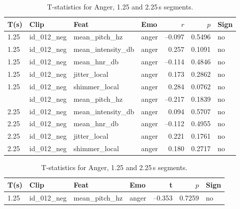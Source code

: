   \begin{table}[ht]
    \centering
    \begin{subtable}[t]{0.48\textwidth}
      \centering
      \caption{Pearson correlations for Anger, 1.25 and 2.25s segments.}
      \label{tab:pearson_anger_125_225s}
      \begin{tabular}{l l l l r r l}
        \toprule
        T(s) & Clip           & Feat             & Emo & $r$ & $p$ & Sign\\
        \midrule
        1.25  & id\_012\_neg & mean\_pitch\_hz     & anger   & –0.097      & 0.5496    & no  \\
        1.25  & id\_012\_neg & mean\_intensity\_db & anger   &  0.257      & 0.1091    & no  \\
        1.25  & id\_012\_neg & mean\_hnr\_db       & anger   & –0.114      & 0.4846    & no  \\
        1.25  & id\_012\_neg & jitter\_local       & anger   &  0.173      & 0.2862    & no  \\
        1.25  & id\_012\_neg & shimmer\_local      & anger   &  0.284      & 0.0762    & no  \\
        \addlinespace
        2.25  & id\_012\_neg & mean\_pitch\_hz     & anger   & –0.217      & 0.1839    & no  \\
        2.25  & id\_012\_neg & mean\_intensity\_db & anger   &  0.094      & 0.5707    & no  \\
        2.25  & id\_012\_neg & mean\_hnr\_db       & anger   & –0.112      & 0.4955    & no  \\
        2.25  & id\_012\_neg & jitter\_local       & anger   &  0.221      & 0.1761    & no  \\
        2.25  & id\_012\_neg & shimmer\_local      & anger   &  0.180      & 0.2717    & no  \\
        \bottomrule
      \end{tabular}
    \end{subtable}%
    \hfill
    \begin{subtable}[t]{0.48\textwidth}
      \centering
      \caption{T-statistics for Anger, 1.25 and 2.25\,s segments.}
      \label{tab:ttest_anger_125_225s}
      \begin{tabular}{l l l l r r l}
        \toprule
        T(s) & Clip           & Feat            & Emo & t & $p$ & Sign \\
        \midrule
        1.25  & id\_012\_neg & mean\_pitch\_hz     & anger   & –0.353      & 0.7259    & no  \\

\end{tabular}
\end{subtable}
\end{table}
